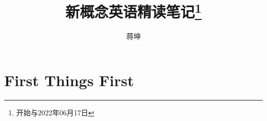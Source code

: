 \documentclass[10pt,UTF8]{ctexbook}
\title{新概念英语精读笔记\footnote{开始与2022年06月17日}}
\author{蒋坤}
\begin{document}
\maketitle





\part{First Things First}


\end{document}

